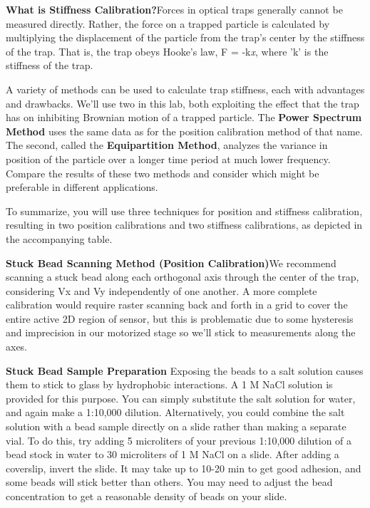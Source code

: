 \documentclass{../lab}
\begin{document}
\textbf{What is Stiffness Calibration?}Forces in optical traps generally cannot be measured directly. Rather, the force on a trapped particle is calculated by multiplying the displacement of the particle from the trap's center by the stiffness of the trap. That is, the trap obeys Hooke's law, F = -k\emph{x}, where 'k' is the stiffness of the trap.

A variety of methods can be used to calculate trap stiffness, each with advantages and drawbacks. We'll use two in this lab, both exploiting the effect that the trap has on inhibiting Brownian motion of a trapped particle. The \textbf{Power Spectrum Method} uses the same data as for the position calibration method of that name. The second, called the \textbf{Equipartition Method}, analyzes the variance in position of the particle over a longer time period at much lower frequency. Compare the results of these two methods and consider which might be preferable in different applications.

To summarize, you will use three techniques for position and stiffness calibration, resulting in two position calibrations and two stiffness calibrations, as depicted in the accompanying table.

\textbf{Stuck Bead Scanning Method (Position Calibration)}We recommend scanning a stuck bead along each orthogonal axis through the center of the trap, considering Vx and Vy independently of one another. A more complete calibration would require raster scanning back and forth in a grid to cover the entire active 2D region of sensor, but this is problematic due to some hysteresis and imprecision in our motorized stage so we'll stick to measurements along the axes.

\textbf{Stuck Bead Sample Preparation} Exposing the beads to a salt solution causes them to stick to glass by hydrophobic interactions. A 1 M NaCl solution is provided for this purpose. You can simply substitute the salt solution for water, and again make a 1:10,000 dilution. Alternatively, you could combine the salt solution with a bead sample directly on a slide rather than making a separate vial. To do this, try adding 5 microliters of your previous 1:10,000 dilution of a bead stock in water to 30 microliters of 1 M NaCl on a slide. After adding a coverslip, invert the slide. It may take up to 10-20 min to get good adhesion, and some beads will stick better than others. You may need to adjust the bead concentration to get a reasonable density of beads on your slide.
\end{document}
